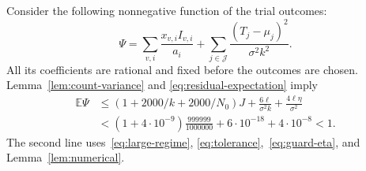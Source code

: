 \documentclass[11pt]{article}
\numberwithin{equation}{section}
\theoremstyle{definition}
\newcommand{\E}{\mathbb E}
\begin{document}
Consider the following nonnegative function of the trial outcomes:
\begin{equation}\label{eq:potential}
 \Psi=\sum_{v,i}\frac{x_{v,i}I_{v,i}}{a_i}
        +\sum_{j\in\mathcal J}
            \frac{(T_j-\mu_j)^2}{\sigma^2k^2}.
\end{equation}
All its coefficients are rational and fixed before the outcomes are
chosen. Lemma~\ref{lem:count-variance} and
\eqref{eq:residual-expectation} imply
\begin{align}
 \E\Psi
 &\le(1+2000/k+2000/N_0)J
            +\frac{6\ell}{\sigma^2 k}+\frac{4\ell\eta}{\sigma^2}
            \label{eq:potential-expectation}\\
 &<(1+4\cdot10^{-9})\frac{999999}{1000000}
                      +6\cdot10^{-18}+4\cdot10^{-8}<1.
 \nonumber
\end{align}
The second line uses~\eqref{eq:large-regime},
\eqref{eq:tolerance},~\eqref{eq:guard-eta}, and
Lemma~\ref{lem:numerical}.
\end{document}
